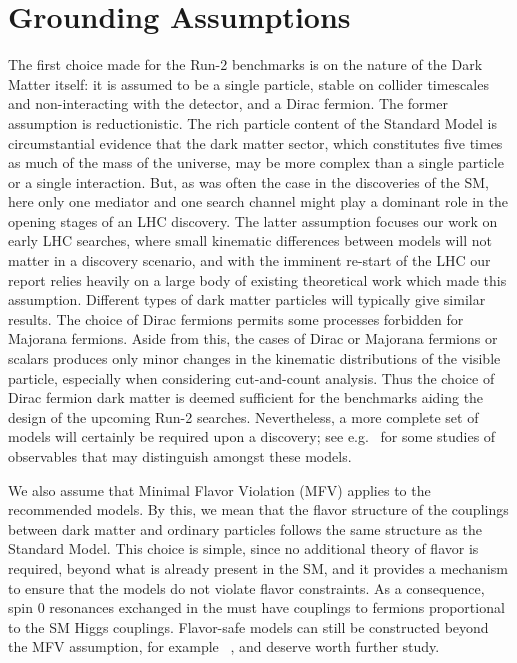 \section{Grounding Assumptions}

The first choice made for the Run-2 benchmarks is on the nature of the
Dark Matter itself: it is assumed to be a single particle, stable on
collider timescales and non-interacting with the detector, and a Dirac
fermion.  The former assumption is reductionistic. The rich particle
content of the Standard Model is circumstantial evidence that the dark
matter sector, which constitutes five times as much of the mass of the
universe, may be more complex than a single particle or a single
interaction. But, as was often the case in the discoveries of the SM,
here only one mediator and one search channel might play a dominant
role in the opening stages of an LHC discovery. The latter assumption
focuses our work on early LHC searches, where small kinematic
differences between models will not matter in a discovery scenario,
and with the imminent re-start of the LHC our report relies heavily on
a large body of existing theoretical work which made this
assumption. Different types of dark matter particles will typically
give similar results. The choice of Dirac fermions permits some
processes forbidden for Majorana fermions. Aside from this, the cases
of Dirac or Majorana fermions or scalars produces only minor changes
in the kinematic distributions of the visible particle, especially
when considering cut-and-count analysis. Thus the choice of Dirac
fermion dark matter is deemed sufficient for the benchmarks aiding the
design of the upcoming Run-2 searches. Nevertheless, a more complete
set of models will certainly be required upon a discovery; see
e.g.~\cite{Cotta:2012nj,Haisch:2013fla,Crivellin:2015wva,} for some
studies of observables that may distinguish amongst these models.

We also assume that Minimal Flavor Violation (MFV) \cite{Chivukula:1987py,Hall:1990ac,Buras:2000dm,D'Ambrosio:2002ex} applies to the
recommended models. By this, we mean that the flavor structure of the
couplings between dark matter and ordinary particles follows the same
structure as the Standard Model. This choice is simple, since no
additional theory of flavor is required, beyond what is already
present in the SM, and it provides a mechanism to ensure that the
models do not violate flavor constraints.  As a consequence, spin 0
resonances exchanged in the \schannel must have couplings to fermions proportional to the SM Higgs couplings. Flavor-safe models can still be constructed beyond the MFV
assumption, for example ~\cite{Agrawal:2014aoa}, and deserve worth further study.

